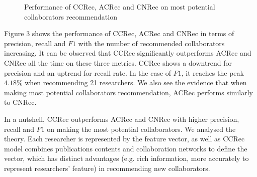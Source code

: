 \documentclass{acm_proc_article-sp}
\begin{document}
\begin{figure}
\centering
{}
\caption{Performance of CCRec, ACRec and CNRec on most potential collaborators recommendation}
\label{fig:3}       %
\end{figure}

Figure 3 shows the performance of CCRec, ACRec and CNRec in terms of precision, recall and $F1$ with the number of recommended collaborators increasing. It can be observed that CCRec significantly outperforms ACRec and CNRec all the time on these three metrics. CCRec shows a downtrend for precision and an uptrend for recall rate. In the case of $F1$, it reaches the peak $4.18\%$ when recommending 21 researchers. We also see the evidence that when making most potential collaborators recommendation, ACRec performs similarly to CNRec.

In a nutshell, CCRec outperforms ACRec and CNRec with higher precision, recall and $F1$ on making the most potential collaborators. We analysed the theory. Each researcher is represented by the feature vector, as well as CCRec model combines publications contents and collaboration networks to define the vector, which has distinct advantages (e.g. rich information, more accurately to represent researchers' feature) in recommending new collaborators.
\end{document}
